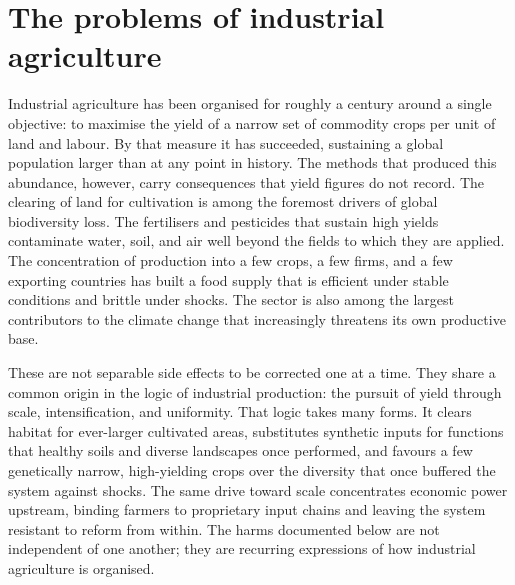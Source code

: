 \section{The problems of industrial agriculture}\label{sec:problems}
Industrial agriculture has been organised for roughly a century around a single objective: to maximise the yield of a narrow set of commodity crops per unit of land and labour. By that measure it has succeeded, sustaining a global population larger than at any point in history. The methods that produced this abundance, however, carry consequences that yield figures do not record. The clearing of land for cultivation is among the foremost drivers of global biodiversity loss. The fertilisers and pesticides that sustain high yields contaminate water, soil, and air well beyond the fields to which they are applied. The concentration of production into a few crops, a few firms, and a few exporting countries has built a food supply that is efficient under stable conditions and brittle under shocks. The sector is also among the largest contributors to the climate change that increasingly threatens its own productive base.

These are not separable side effects to be corrected one at a time. They share a common origin in the logic of industrial production: the pursuit of yield through scale, intensification, and uniformity. That logic takes many forms. It clears habitat for ever-larger cultivated areas, substitutes synthetic inputs for functions that healthy soils and diverse landscapes once performed, and favours a few genetically narrow, high-yielding crops over the diversity that once buffered the system against shocks. The same drive toward scale concentrates economic power upstream, binding farmers to proprietary input chains and leaving the system resistant to reform from within. The harms documented below are not independent of one another; they are recurring expressions of how industrial agriculture is organised.

